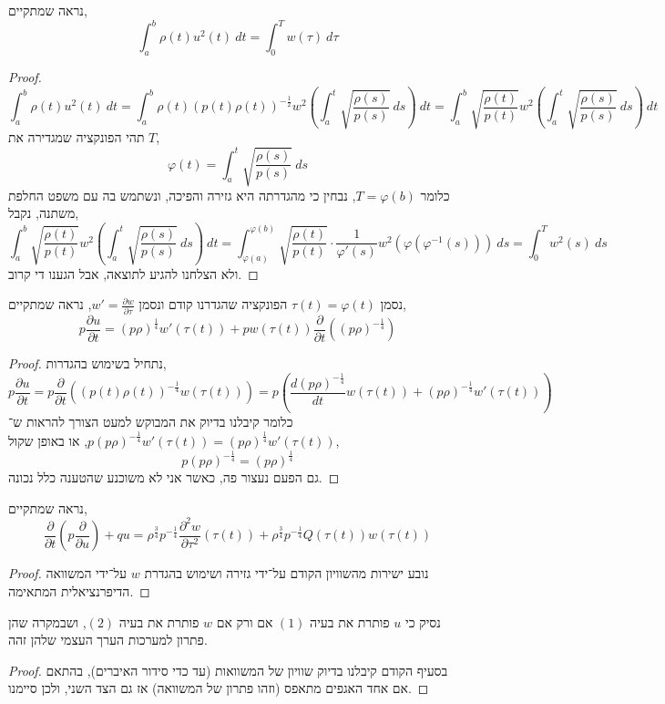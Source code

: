 \subquestion{}
נראה שמתקיים,
\[
	\int_{a}^{b} \rho(t) u^2(t)\ dt
	= \int_{0}^{T} w(\tau)\ d \tau
\]
\begin{proof}
	\[
		\int_{a}^{b} \rho(t) u^2(t)\ dt
		= \int_{a}^{b} \rho(t) {(p(t) \rho(t))}^{-\frac{1}{2}} w^2\left(\int_{a}^{t} \sqrt{\frac{\rho(s)}{p(s)}}\ ds\right)\ dt
		= \int_{a}^{b} \sqrt{\frac{\rho(t)}{p(t)}} w^2\left(\int_{a}^{t} \sqrt{\frac{\rho(s)}{p(s)}}\ ds\right)\ dt
	\]
	תהי הפונקציה שמגדירה את $T$,
	\[
		\varphi(t)
		= \int_{a}^{t} \sqrt{\frac{\rho(s)}{p(s)}}\ ds
	\]
	כלומר $T = \varphi(b)$, נבחין כי מהגדרתה היא גזירה והפיכה, ונשתמש בה עם משפט החלפת משתנה, נקבל,
	\[
		\int_{a}^{b} \sqrt{\frac{\rho(t)}{p(t)}} w^2\left(\int_{a}^{t} \sqrt{\frac{\rho(s)}{p(s)}}\ ds\right)\ dt
		= \int_{\varphi(a)}^{\varphi(b)} \sqrt{\frac{\rho(t)}{p(t)}} \cdot \frac{1}{\varphi'(s)} w^2\left(\varphi(\varphi^{-1}(s))\right)\ ds
		= \int_{0}^{T} w^2(s)\ ds
	\]
	ולא הצלחנו להגיע לתוצאה, אבל הגענו די קרוב.
\end{proof}

\subquestion{}
נסמן $\tau(t) = \varphi(t)$ הפונקציה שהגדרנו קודם ונסמן $w' = \frac{\partial w}{\partial \tau}$,
נראה שמתקיים,
\[
	p \frac{\partial u}{\partial t}
	= {(p \rho)}^{\frac{1}{4}} w'(\tau(t)) + p w(\tau(t)) \frac{\partial}{\partial t}({(p \rho)}^{-\frac{1}{4}})
\]
\begin{proof}
	נתחיל בשימוש בהגדרות,
	\[
		p \frac{\partial u}{\partial t}
		= p \frac{\partial}{\partial t} \left( {(p(t) \rho(t))}^{-\frac{1}{4}} w(\tau(t)) \right)
		= p (\frac{d {(p \rho)}^{-\frac{1}{4}}}{dt} w(\tau(t)) + {(p \rho)}^{-\frac{1}{4}} w'(\tau(t)))
	\]
	כלומר קיבלנו בדיוק את המבוקש למעט הצורך להראות ש־$p {(p \rho)}^{-\frac{1}{4}} w'(\tau(t)) = {(p \rho)}^{\frac{1}{4}} w'(\tau(t))$, או באופן שקול,
	\[
		p {(p \rho)}^{-\frac{1}{4}}
		= {(p \rho)}^{\frac{1}{4}}
	\]
	גם הפעם נעצור פה, כאשר אני לא משוכנע שהטענה כלל נכונה.
\end{proof}

\subquestion{}
נראה שמתקיים,
\[
	\frac{\partial}{\partial t} (p \frac{\partial}{\partial u}) + q u
	= \rho^{\frac{3}{4}} p^{-\frac{1}{4}} \frac{\partial^2 w}{\partial \tau^2}(\tau(t)) + \rho^{\frac{3}{4}} p^{-\frac{1}{4}} Q(\tau(t)) w(\tau(t))
\]
\begin{proof}
	נובע ישירות מהשוויון הקודם על־ידי גזירה ושימוש בהגדרת $w$ על־ידי המשוואה הדיפרנציאלית המתאימה.
\end{proof}

\subquestion{}
נסיק כי $u$ פותרת את בעיה $(1)$ אם ורק אם $w$ פותרת את בעיה $(2)$, ושבמקרה שהן פתרון למערכות הערך העצמי שלהן זהה.
\begin{proof}
	בסעיף הקודם קיבלנו בדיוק שוויון של המשוואות (עד כדי סידור האיברים), בהתאם אם אחד האגפים מתאפס (וזהו פתרון של המשוואה) אז גם הצד השני, ולכן סיימנו.
\end{proof}


